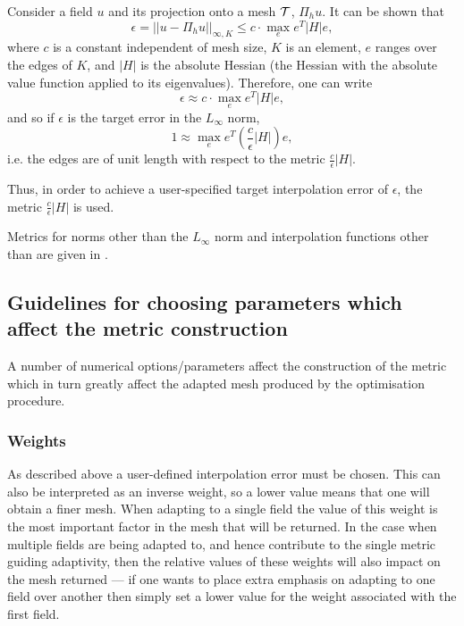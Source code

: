 Consider a field $u$ and its \Pone projection onto a mesh $\cal{T}$,
$\Pi_h u$. It can be shown \citep{frey2005} that
\begin{equation}
\epsilon = ||u - \Pi_h u||_{{\infty},K} \le c \cdot \max_e e^T \left| H \right| e,
\end{equation}
where $c$ is a constant independent of mesh size, $K$ is an element, $e$ ranges
over the edges of $K$, and $\left| H \right|$ is the absolute Hessian (the Hessian
with the absolute value function applied to its eigenvalues).
Therefore, one can write
\begin{equation}
\epsilon \approx c \cdot \max_e e^T \left| H \right| e,
\end{equation}
and so if $\epsilon$ is the target error in the $L_{\infty}$ norm,
\begin{equation}
1 \approx \max_e e^T \left( \frac{c}{\epsilon} \left| H \right| \right) e,
\end{equation}
i.e. the edges are of unit length with respect to the metric
$\frac{c}{\epsilon} \left| H \right|$.

Thus, in order to achieve a user-specified target interpolation error of $\epsilon$,
the metric $\frac{c}{\epsilon} \left| H \right|$ is used.

Metrics for norms other than the $L_{\infty}$ norm and interpolation functions
other than \Pone are given in \citet{huang2005}.

\subsection{Guidelines for choosing parameters which affect the metric construction}
A number of numerical options/parameters affect the construction of the metric 
which in turn greatly affect the adapted mesh produced by the optimisation procedure.

\subsubsection{Weights}
As described above a user-defined interpolation error must be chosen. This can also
be interpreted as an inverse weight, so a lower value means that one will obtain a
finer mesh. When adapting to a single field the value of this weight is the most
important factor in the mesh that will be returned. In the case when multiple
fields are being adapted to, and hence contribute to the single metric guiding
adaptivity, then the relative values of these weights will also impact on the 
mesh returned --- if one wants to place extra emphasis on adapting to one
field over another then simply set a lower value for the weight associated with
the first field.

